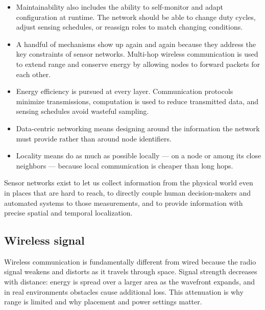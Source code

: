 \begin{itemize}
    \item Maintainability also includes the ability to self-monitor and adapt configuration at runtime. The network should be able to change duty cycles, adjust sensing schedules, or reassign roles to match changing conditions.
    \item A handful of mechanisms show up again and again because they address the key constraints of sensor networks. Multi-hop wireless communication is used to extend range and conserve energy by allowing nodes to forward packets for each other. 
    \item Energy efficiency is pursued at every layer. Communication protocols minimize transmissions, computation is used to reduce transmitted data, and sensing schedules avoid wasteful sampling.
    \item Data-centric networking means designing around the information the network must provide rather than around node identifiers. 
    \item Locality means do as much as possible locally — on a node or among its close neighbors — because local communication is cheaper than long hops.
\end{itemize}
Sensor networks exist to let us collect information from the physical world even in places that are hard to reach, to directly couple human decision-makers and automated systems to those measurements, and to provide information with precise spatial and temporal localization.

\subsection{Wireless signal}
Wireless communication is fundamentally different from wired because the radio signal weakens and distorts as it travels through space. Signal strength decreases with distance: energy is spread over a larger area as the wavefront expands, and in real environments obstacles cause additional loss. This attenuation is why range is limited and why placement and power settings matter.

